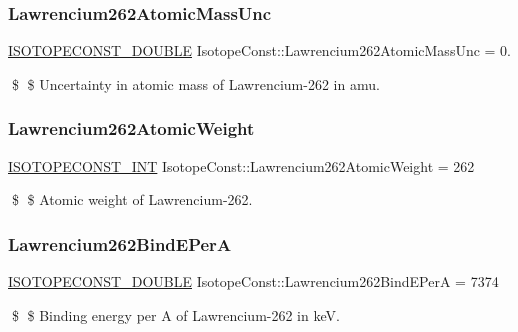 \subsubsection{\texorpdfstring{Lawrencium262\+Atomic\+Mass\+Unc}{Lawrencium262AtomicMassUnc}}
{\footnotesize\ttfamily \mbox{\hyperlink{group___isotope_const-_macros_ga8f45a7272ce02c0b4c65c44636ed719a}{I\+S\+O\+T\+O\+P\+E\+C\+O\+N\+S\+T\+\_\+\+D\+O\+U\+B\+LE}} Isotope\+Const\+::\+Lawrencium262\+Atomic\+Mass\+Unc = 0.}

\$ \$ Uncertainty in atomic mass of Lawrencium-\/262 in amu. \mbox{\label{group___isotope_const-_lawrencium-_lr262_ga6f05f4534c323b35639ba508b3d8ad8f}} 
\subsubsection{\texorpdfstring{Lawrencium262\+Atomic\+Weight}{Lawrencium262AtomicWeight}}
{\footnotesize\ttfamily \mbox{\hyperlink{group___isotope_const-_macros_ga5f18360b3e99483a35c32d789e62621c}{I\+S\+O\+T\+O\+P\+E\+C\+O\+N\+S\+T\+\_\+\+I\+NT}} Isotope\+Const\+::\+Lawrencium262\+Atomic\+Weight = 262}

\$ \$ Atomic weight of Lawrencium-\/262. \mbox{\label{group___isotope_const-_lawrencium-_lr262_gaca23ea92c5d7492b4ea29c26c5afd4f2}} 
\subsubsection{\texorpdfstring{Lawrencium262\+Bind\+E\+PerA}{Lawrencium262BindEPerA}}
{\footnotesize\ttfamily \mbox{\hyperlink{group___isotope_const-_macros_ga8f45a7272ce02c0b4c65c44636ed719a}{I\+S\+O\+T\+O\+P\+E\+C\+O\+N\+S\+T\+\_\+\+D\+O\+U\+B\+LE}} Isotope\+Const\+::\+Lawrencium262\+Bind\+E\+PerA = 7374}

\$ \$ Binding energy per A of Lawrencium-\/262 in keV. \mbox{\label{group___isotope_const-_lawrencium-_lr262_gadbf02d2c44bc1a8c8cae059001253ac3}} 
